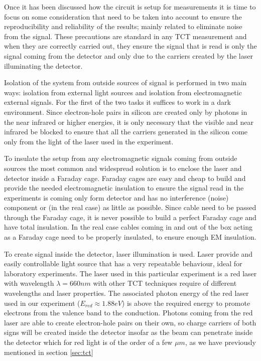 Once it has been discussed how the circuit is setup for measurements it is time to focus on some consideration that need to be taken into account to ensure the reproducibility and reliability of the results; mainly related to eliminate noise from the signal. These precautions are standard in any TCT measurement and when they are correctly carried out, they ensure the signal that is read is  only the signal coming from the detector and only due to the carriers created by the laser illuminating the detector.

Isolation of the system from outside sources of signal is performed in two main ways: isolation from external light sources and isolation from electromagnetic external signals. For the first of the two tasks it suffices to work in a dark environment. Since electron-hole pairs in silicon are created only by photons in the near infrared or higher energies, it is only necessary that the visible and near infrared be blocked to ensure that all the carriers generated in the silicon come only from the light of the laser used in the experiment.

To insulate the setup from any electromagnetic signals coming from outside sources the most common and widespread solution is to enclose the laser and detector inside a Faraday cage. Faraday cages are easy and cheap to build and provide the needed electromagnetic insulation to ensure the signal read in the experiments is coming only form detector and has no interference (noise) component or (in the real case) as little as possible. Since cable need to be passed through the Faraday cage, it is never possible to build a perfect Faraday cage and have total insulation. In the real case cables coming in and out of the box acting as a Faraday cage need to be properly insulated, to ensure enough EM insulation.

To create signal inside the detector, laser illumination is used. Laser provide and easily controllable light source that has a very repeatable behaviour, ideal for laboratory experiments. The laser used in this particular experiment is a red laser with wavelength $\lambda = 660nm$ with other TCT techniques require of different wavelengths and laser properties. The associated photon energy of the red laser used in our experiment ($E_{red} \approx 1.88 eV$) is above the required energy to promote electrons from the valence band to the conduction. Photons coming from the red laser are able to create electron-hole pairs on their own, so charge carriers of both signs will be created inside the detector insofar as the beam can penetrate inside the detector which for red light is of the order of a few $\mu m$, as we have previously mentioned in section \ref{sec:tct}

